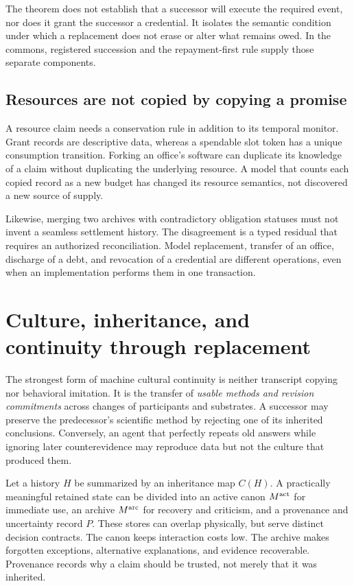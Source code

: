 \documentclass[11pt,letterpaper]{article}
\theoremstyle{plain}
\theoremstyle{definition}
\theoremstyle{remark}
\begin{document}
The theorem does not establish that a successor will execute the required event, nor does it grant the successor a credential. It isolates the semantic condition under which a replacement does not erase or alter what remains owed. In the commons, registered succession and the repayment-first rule supply those separate components.

\subsection{Resources are not copied by copying a promise}
A resource claim needs a conservation rule in addition to its temporal monitor. Grant records are descriptive data, whereas a spendable slot token has a unique consumption transition. Forking an office's software can duplicate its knowledge of a claim without duplicating the underlying resource. A model that counts each copied record as a new budget has changed its resource semantics, not discovered a new source of supply.

Likewise, merging two archives with contradictory obligation statuses must not invent a seamless settlement history. The disagreement is a typed residual that requires an authorized reconciliation. Model replacement, transfer of an office, discharge of a debt, and revocation of a credential are different operations, even when an implementation performs them in one transaction.

\section{Culture, inheritance, and continuity through replacement}\label{sec:culture}

The strongest form of machine cultural continuity is neither transcript copying nor behavioral imitation. It is the transfer of \emph{usable methods and revision commitments} across changes of participants and substrates. A successor may preserve the predecessor's scientific method by rejecting one of its inherited conclusions. Conversely, an agent that perfectly repeats old answers while ignoring later counterevidence may reproduce data but not the culture that produced them.

Let a history $H$ be summarized by an inheritance map $C(H)$. A practically meaningful retained state can be divided into an active canon $M^{\rm act}$ for immediate use, an archive $M^{\rm arc}$ for recovery and criticism, and a provenance and uncertainty record $P$. These stores can overlap physically, but serve distinct decision contracts. The canon keeps interaction costs low. The archive makes forgotten exceptions, alternative explanations, and evidence recoverable. Provenance records why a claim should be trusted, not merely that it was inherited.
\end{document}
